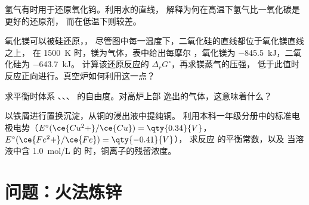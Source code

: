 \begin{exercise}[$\star\star$]\label{exo:b2:ellingham:9}
氢气有时用于还原氧化钨。利用水的直线，
解释为何在高温下氢气比一氧化碳是更好的还原剂，
而在低温下则较差。
\end{exercise}

\begin{exercise}[$\star\star\star$]\label{exo:b2:ellingham:10}
氧化镁可以被硅还原，，
尽管图中每一温度下，二氧化硅的直线都位于氧化镁直线之上，
在 \qty{1500}{K} 时，镁为气体，表中给出每摩尔
，氧化镁为 \qty{-845.5}{kJ}，二氧化硅为 \qty{-643.7}{kJ}。
计算该还原反应的 $\Delta_r G^\circ$，再求镁蒸气的压强，
低于此值时反应正向进行。真空炉如何利用这一点？
\end{exercise}

\begin{exercise}[$\star\star\star$]\label{exo:b2:ellingham:11}
求平衡时体系 、、、
 的自由度。对高炉上部
逸出的气体，这意味着什么？
\end{exercise}

\begin{exercise}[$\star\star\star$]\label{exo:b2:ellingham:12}
以铁屑进行置换沉淀，从铜的浸出液中提纯铜。
利用本科一年级分册中的标准电极电势（$E^\circ(\ce{Cu^2+}/\ce{Cu})
= \qty{0.34}{V}$，$E^\circ(\ce{Fe^2+}/\ce{Fe}) = \qty{-0.41}{V}$），
求反应  的平衡常数，以及
当溶液中含 \qty{1.0}{mol/L} 的
 时，铜离子的残留浓度。
\end{exercise}

\section{问题：火法炼锌}

